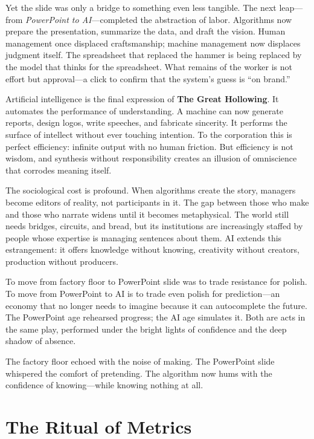 \documentclass[11pt,twoside]{book}
\begin{document}
Yet the slide was only a bridge to something even less tangible.  
The next leap—from \emph{PowerPoint to AI}—completed the abstraction of labor.  
Algorithms now prepare the presentation, summarize the data, and draft the vision.  Human management once displaced craftsmanship; machine management now displaces judgment itself.  The spreadsheet that replaced the hammer is being replaced by the model that thinks for the spreadsheet.  What remains of the worker is not effort but approval—a click to confirm that the system’s guess is “on brand.”

Artificial intelligence is the final expression of \textbf{The Great Hollowing}.  
It automates the performance of understanding.  A machine can now generate reports, design logos, write speeches, and fabricate sincerity.  It performs the surface of intellect without ever touching intention.  To the corporation this is perfect efficiency: infinite output with no human friction.  But efficiency is not wisdom, and synthesis without responsibility creates an illusion of omniscience that corrodes meaning itself.

The sociological cost is profound.  When algorithms create the story, managers become editors of reality, not participants in it.  The gap between those who make and those who narrate widens until it becomes metaphysical.  The world still needs bridges, circuits, and bread, but its institutions are increasingly staffed by people whose expertise is managing sentences about them.  AI extends this estrangement: it offers knowledge without knowing, creativity without creators, production without producers.

To move from factory floor to PowerPoint slide was to trade resistance for polish.  
To move from PowerPoint to AI is to trade even polish for prediction—an economy that no longer needs to imagine because it can autocomplete the future.  
The PowerPoint age rehearsed progress; the AI age simulates it.  
Both are acts in the same play, performed under the bright lights of confidence and the deep shadow of absence.

The factory floor echoed with the noise of making.  
The PowerPoint slide whispered the comfort of pretending.  
The algorithm now hums with the confidence of knowing—while knowing nothing at all.

%
\chapter{The Ritual of Metrics}
\label{ch:03}
\end{document}
